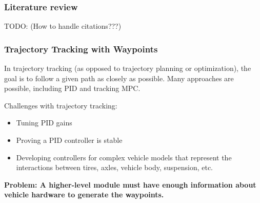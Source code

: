 \documentclass{beamer}
\begin{document}
%	



\begin{frame}
\frametitle{Literature review}

TODO: (How to handle citations???)
\end{frame}

\begin{frame}
	\frametitle{Trajectory Tracking with Waypoints}
In trajectory tracking (as opposed to trajectory planning or optimization), the goal is to follow a given path as closely as possible. Many approaches are possible, including	PID and tracking MPC.

Challenges with trajectory tracking:
	\begin{itemize}
		\item Tuning PID gains
		\item Proving a PID controller is stable
		\item Developing controllers for complex vehicle models that represent the interactions between tires, axles, vehicle body, suspension, etc.
	\end{itemize}
\textbf{Problem: A higher-level module must have enough information about vehicle hardware to generate the waypoints.}
\end{frame}
	
\end{document}
